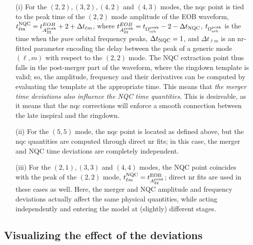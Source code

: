 \documentclass[prd,amssymb,amsmath,amsfonts,nofootinbib,reprint,showpacs,longbibliography]{revtex4-1}
\begin{document}
\begin{itemize}

\item[(i)] For the $(2,2), (3,2), (4,2)$ and $(4,3)$ modes, the \ac{nqc} point is tied to the peak time of the $(2,2)$
mode amplitude of the EOB waveform, $t_{\ell m}^{\rm NQC} = t_{A_{22}^{\rm peak}}^{EOB} + 2 + \Delta t_{\ell m}$, 
where $t_{A_{22}^{\rm peak}}^{EOB} = t_{\Omega_{\rm orb}^{\rm peak}} - 2 - \Delta t_{\rm NQC}$, $t_{\Omega_{\rm orb}^{\rm peak}}$
is the time when the \textit{pure} orbital frequency peaks, $\Delta t_{\rm NQC} = 1$, and $\Delta t_{\ell m}$ is an \ac{nr}-fitted parameter
encoding the delay between the peak of a generic mode $(\ell, m)$ with respect to the $(2,2)$ mode.
The NQC extraction point thus falls in the post-merger part of the waveform, where the ringdown
template is valid; so, the amplitude, frequency and their derivatives can be computed by evaluating the
template at the appropriate time. This means that \textit{the merger time deviations also influence the NQC time
quantities}. This is desireable, as it means that the \ac{nqc} corrections will enforce a smooth connection between
the late inspiral and the ringdown.
\item[(ii)] For the $(5,5)$ mode, the \ac{nqc} point is located as defined above, but the \ac{nqc} quantities
are computed through direct \ac{nr} fits; in this case, the merger and NQC time deviations are completely independent.
\item[(iii)] For the $(2,1), (3,3)$ and $(4,4)$ modes, the NQC point coincides
with the peak of the $(2,2)$ mode, $t_{\ell m}^{\rm NQC} = t_{A_{22}^{\rm peak}}^{\rm EOB}$; direct \ac{nr} fits 
are used in these cases as well. Here, the merger and NQC amplitude and frequency deviations actually affect
the same physical quantities, while acting independently and entering the model at (slightly) different stages.
\end{itemize}

\subsection{Visualizing the effect of the deviations}
\end{document}
